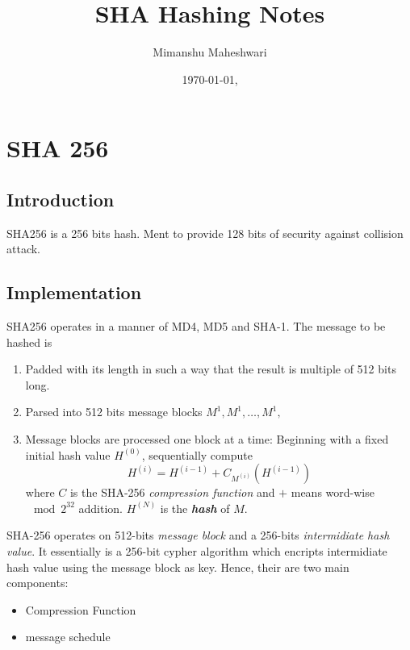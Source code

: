 \documentclass{report}
\author{Mimanshu Maheshwari}
\title{\textbf{SHA Hashing Notes}}
\date{\today, \currenttime}
\begin{document}
\maketitle
\tableofcontents
\listoftables

\chapter{SHA 256}
\section{Introduction}
SHA256 is a 256 bits hash. Ment to provide 128 bits of security against collision attack. 
\section{Implementation}
SHA256 operates in a manner of MD4, MD5 and SHA-1. 
The message to be hashed is 
\begin{enumerate}

	\item{Padded with its length in such a way that the result is multiple of 512 bits long.}
	\item{Parsed into 512 bits message blocks $M^{1}, M^{1}, \ldots, M^{1},$}
	\item{Message blocks are processed one block at a time: Beginning with a fixed initial hash value	$H^{(0)}$, sequentially compute}
		\[ H^{(i)} = H^{(i-1)} + C_{M^{(i)}}(H^{(i-1)}) \]
		where $C$ is the SHA-256 \textit{compression function} and $+$ means word-wise $\mod 2^{32}$ addition. $H^{(N)}$ is the \textit{\textbf{hash}} of $M$.
\end{enumerate}

SHA-256 operates on 512-bits \textit{message block} and a 256-bits \textit{intermidiate hash value}. 
It essentially is a 256-bit cypher algorithm which encripts intermidiate hash value using the message block as key. 
Hence, their are two main components: 
\begin{itemize}
	\item{Compression Function}
	\item{message schedule}
\end{itemize}
\end{document}
